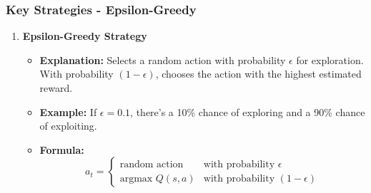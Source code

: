 \documentclass[aspectratio=169]{beamer}
\begin{document}
\begin{frame}[fragile]
    \frametitle{Key Strategies - Epsilon-Greedy}
    \begin{enumerate}
        \item \textbf{Epsilon-Greedy Strategy}
        \begin{itemize}
            \item \textbf{Explanation:} Selects a random action with probability $\epsilon$ for exploration. With probability $(1-\epsilon)$, chooses the action with the highest estimated reward.
            \item \textbf{Example:} If $\epsilon = 0.1$, there's a 10\% chance of exploring and a 90\% chance of exploiting.
            \item \textbf{Formula:}
            \begin{equation}
                a_t = \begin{cases} 
                    \text{random action} & \text{with probability } \epsilon \\ 
                    \text{argmax } Q(s, a) & \text{with probability } (1 - \epsilon) 
                \end{cases}
            \end{equation}
        \end{itemize}
    \end{enumerate}
\end{frame}
\end{document}
